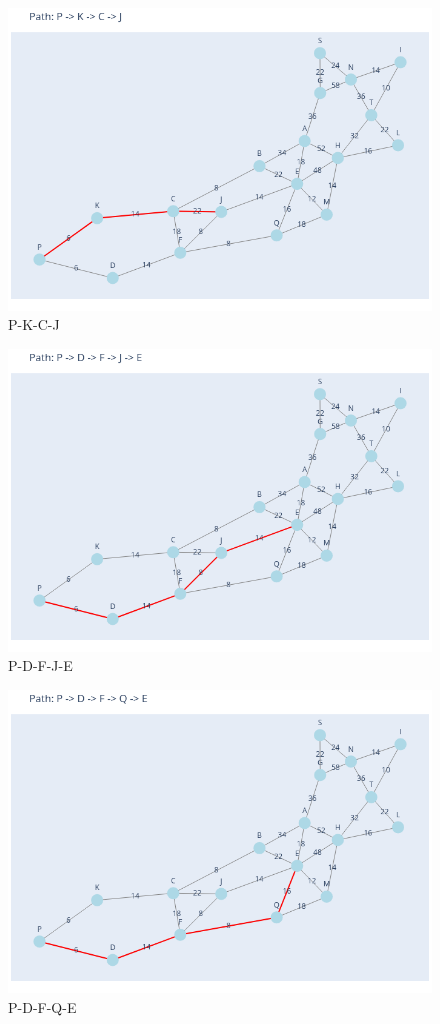 \documentclass[11pt]{book}
\renewcommand{\=}[1]{\stackrel{#1}{=}} %
\theoremstyle{definition}
\theoremstyle{remark}
\begin{document}
\begin{figure}
    \centering
    \includegraphics[width=0.7\linewidth]{Plots/P_K_C_J.png}
    \caption{P-K-C-J}
    \label{fig:enter-label}
\end{figure}
\begin{figure}
    \centering
    \includegraphics[width=0.7\linewidth]{Plots/P_D_F_J_E.png}
    \caption{P-D-F-J-E}
    \label{fig:enter-label}
\end{figure}
\begin{figure}
    \centering
    \includegraphics[width=0.7\linewidth]{Plots/P_D_F_Q_E.png}
    \caption{P-D-F-Q-E}
    \label{fig:enter-label}
\end{figure}
\end{document}
